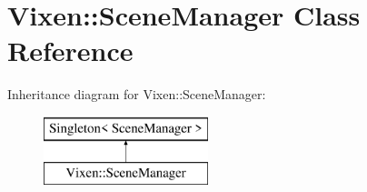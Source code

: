 \hypertarget{class_vixen_1_1_scene_manager}{}\section{Vixen\+:\+:Scene\+Manager Class Reference}
\label{class_vixen_1_1_scene_manager}
Inheritance diagram for Vixen\+:\+:Scene\+Manager\+:\begin{figure}[H]
\begin{center}
\leavevmode
\includegraphics[height=2.000000cm]{class_vixen_1_1_scene_manager}
\end{center}
\end{figure}
